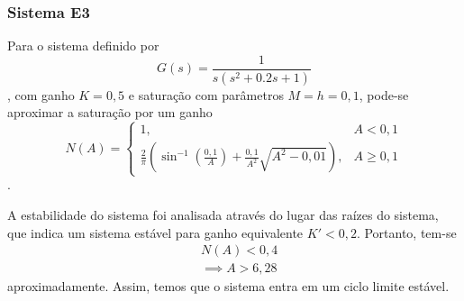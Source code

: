 \documentclass[a4paper]{report}
\begin{document}
\subsubsection*{Sistema E3}

Para o sistema definido por \[
    G(s) = \frac{1}{s(s^2+0.2s+1)}
\], com ganho $K=0,5$ e saturação com parâmetros $M=h=0,1$, pode-se aproximar a saturação por um ganho \[
    N(A) = \begin{cases}
	1,& A<0,1 \\
	\frac{2}{\pi}\left( \sin^{-1}\left( \frac{0,1}{A} \right) + \frac{0,1}{A^2}\sqrt{A^2 - 0,01}  \right),& A\ge 0,1
    \end{cases}
\].

A estabilidade do sistema foi analisada através do lugar das raízes do sistema, que indica um sistema estável para ganho equivalente $K'<0,2$. Portanto, tem-se
\begin{align*}
    &N(A) < 0,4 \\
    &\implies A > 6,28
\end{align*}
aproximadamente. Assim, temos que o sistema entra em um ciclo limite estável.
\end{document}
